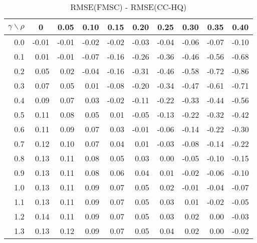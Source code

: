 \documentclass[12pt]{article}
\begin{document}
%
\begin{table}[!tbp]
\caption{RMSE(FMSC) - RMSE(CC-HQ)}
 \begin{center}
 \begin{tabular}{r|rrrrrrrrr}\hline\hline
\multicolumn{1}{c|}{$\gamma\backslash\rho$}&\multicolumn{1}{c}{0}&\multicolumn{1}{c}{0.05}&\multicolumn{1}{c}{0.10}&\multicolumn{1}{c}{0.15}&\multicolumn{1}{c}{0.20}&\multicolumn{1}{c}{0.25}&\multicolumn{1}{c}{0.30}&\multicolumn{1}{c}{0.35}&\multicolumn{1}{c}{0.40}\tabularnewline
\hline
0.0&-0.01&-0.01&-0.02&-0.02&-0.03&-0.04&-0.06&-0.07&-0.10\tabularnewline
0.1& 0.01&-0.01&-0.07&-0.16&-0.26&-0.36&-0.46&-0.56&-0.68\tabularnewline
0.2& 0.05& 0.02&-0.04&-0.16&-0.31&-0.46&-0.58&-0.72&-0.86\tabularnewline
0.3& 0.07& 0.05& 0.01&-0.08&-0.20&-0.34&-0.47&-0.61&-0.71\tabularnewline
0.4& 0.09& 0.07& 0.03&-0.02&-0.11&-0.22&-0.33&-0.44&-0.56\tabularnewline
0.5& 0.11& 0.08& 0.05& 0.01&-0.05&-0.13&-0.22&-0.32&-0.42\tabularnewline
0.6& 0.11& 0.09& 0.07& 0.03&-0.01&-0.06&-0.14&-0.22&-0.30\tabularnewline
0.7& 0.12& 0.10& 0.07& 0.04& 0.01&-0.03&-0.08&-0.14&-0.22\tabularnewline
0.8& 0.13& 0.11& 0.08& 0.05& 0.03& 0.00&-0.05&-0.10&-0.15\tabularnewline
0.9& 0.13& 0.11& 0.08& 0.06& 0.04& 0.01&-0.02&-0.06&-0.10\tabularnewline
1.0& 0.13& 0.11& 0.09& 0.07& 0.05& 0.02&-0.01&-0.04&-0.07\tabularnewline
1.1& 0.13& 0.11& 0.09& 0.07& 0.05& 0.03& 0.01&-0.02&-0.05\tabularnewline
1.2& 0.14& 0.11& 0.09& 0.07& 0.05& 0.03& 0.02& 0.00&-0.03\tabularnewline
1.3& 0.13& 0.12& 0.09& 0.07& 0.05& 0.04& 0.02& 0.00&-0.02\tabularnewline
\hline
\end{tabular}

\end{center}

\end{table}
\end{document}
